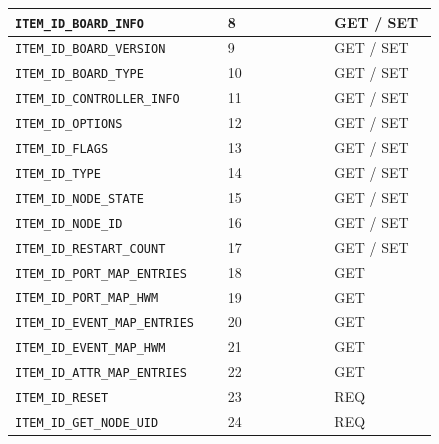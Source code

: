 {\begin{longtable}{@{}|p{0.4\linewidth}|p{0.06\linewidth}|p{0.08\linewidth}|p{0.08\linewidth}|p{0.22\linewidth}|@{}}
    \texttt{ITEM\_ID\_BOARD\_INFO}       & 8   & & & GET / SET \\
    \midrule

    \texttt{ITEM\_ID\_BOARD\_VERSION}    & 9   & & & GET / SET \\
    \midrule

    \texttt{ITEM\_ID\_BOARD\_TYPE}       & 10  & & & GET / SET \\
    \midrule

    \texttt{ITEM\_ID\_CONTROLLER\_INFO}  & 11  & & & GET / SET \\
    \midrule

    \texttt{ITEM\_ID\_OPTIONS}           & 12  & & & GET / SET \\
    \midrule

    \texttt{ITEM\_ID\_FLAGS}             & 13  & & & GET / SET \\
    \midrule

    \texttt{ITEM\_ID\_TYPE}              & 14  & & & GET / SET \\
    \midrule

    \texttt{ITEM\_ID\_NODE\_STATE}       & 15  & & & GET / SET \\
    \midrule

    \texttt{ITEM\_ID\_NODE\_ID}          & 16  & & & GET / SET \\
    \midrule

    \texttt{ITEM\_ID\_RESTART\_COUNT}    & 17  & & & GET / SET \\
    \midrule

    \texttt{ITEM\_ID\_PORT\_MAP\_ENTRIES} & 18 & & & GET \\
    \midrule

    \texttt{ITEM\_ID\_PORT\_MAP\_HWM}    & 19  & & & GET \\
    \midrule

    \texttt{ITEM\_ID\_EVENT\_MAP\_ENTRIES} & 20 & & & GET \\
    \midrule

    \texttt{ITEM\_ID\_EVENT\_MAP\_HWM}   & 21  & & & GET \\
    \midrule

    \texttt{ITEM\_ID\_ATTR\_MAP\_ENTRIES} & 22 & & & GET \\
    \midrule

    \texttt{ITEM\_ID\_RESET}             & 23  & & & REQ \\
    \midrule

    \texttt{ITEM\_ID\_GET\_NODE\_UID}    & 24  & & & REQ \\
    \midrule


\end{longtable}}
